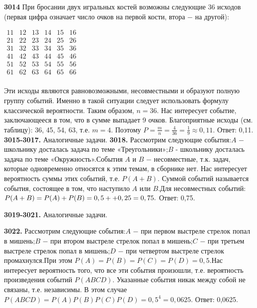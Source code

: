 \textbf{3014} При бросании двух игральных костей возможны следующие 36 исходов (первая цифра означает число очков на первой кости, втора $-$ на другой):
\begin{center}$
\begin{matrix}
11& 12& 13& 14& 15& 16&\\
21& 22& 23& 24& 25& 26&\\
31& 32& 33& 34& 35& 36&\\
41& 42& 43& 44& 45& 46&\\
51& 52& 53& 54& 55& 56&\\
61& 62& 63& 64& 65& 66&\\
\end{matrix}$
\end{center}
Эти исходы являются равновозможными, несовместными и образуют полную группу событий. Именно в такой ситуации следует использовать формулу классической вероятности. Таким образом, $n=36.$
Нас интересует событие, заключающееся в том, что в сумме выпадает 9 очков. Благоприятные исходы (см. таблицу): 36, 45, 54, 63, т.е. $m=4$. Поэтому $P = \frac{m}{n}=\frac{4}{36}=\frac{1}{9}\approx0,11.$ \newline \null \hspace*{\fill} Ответ: 0,11. \newline
\textbf{3015-3017.} Аналогичные задачи.\newline
\textbf{3018.} Рассмотрим следующие события:\newline$A$ $-$ школьнику досталась задача по теме «Треугольники»;\newline$B$ - школьнику досталась задача по теме «Окружность».\newline События $A$ и $B$ $-$ несовместные, т.к. задач, которые одновременно относятся к этим темам, в сборнике нет. Нас интересует вероятность суммы этих событий, т.е. $P(A+B)$. Суммой событий называется события, состоящее в том, что наступило $A$ или $B$.\newline Для несовместных событий: $P(A+B)=P(A)+P(B)=0,5+\linebreak+0,25=0,75.$\null \hspace*{\fill} Ответ: 0,75. 

\textbf{3019-3021.} Аналогичные задачи.

\textbf{3022.} Рассмотрим следующие события:\newline $A$ $-$ при первом выстреле стрелок попал в мишень;\newline$B$ $-$ при втором выстреле стрелок попал в мишень;\newline$C$ $-$ при третьем выстреле стрелок попал в мишень;\newline$D$ $-$ при четвертом выстреле стрелок промахнулся.\newline При этом $P(A)=P(B)=P(C)=P(D)=0,5.$\newline Нас интересует вероятность того, что все эти события произошли, т.е. вероятность произведения событий $P(ABCD)$. Указанные события никак между собой не связаны, т.е. независимы. В этом случае $P(ABCD)=P(A)P(B)P(C)P(D)=0,5^4=0,0625.$ \newline \null \hspace*{\fill} Ответ: 0,0625. 

